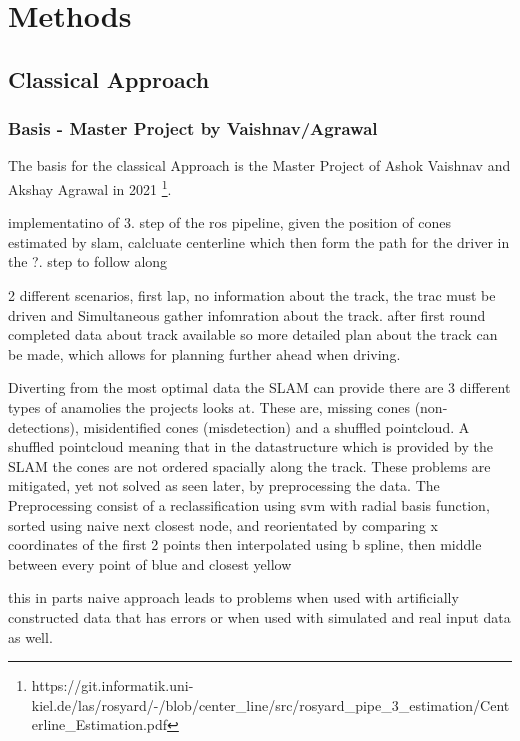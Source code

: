 \graphicspath{{Chapter/Figs/methods/}}
\chapter{Methods}

\section{Classical Approach}

\subsection{Basis - Master Project by Vaishnav/Agrawal}
The basis for the classical Approach is the Master Project of Ashok Vaishnav and Akshay Agrawal in 2021 \footnote{https://git.informatik.uni-kiel.de/las/rosyard/-/blob/center_line/src/rosyard_pipe_3_estimation/Centerline_Estimation.pdf}.

implementatino of 3. step of the ros pipeline, given the position of cones estimated by slam, calcluate centerline which then form the path for the driver in the ?. step to follow along

2 different scenarios, first lap, no information about the track, the trac must be driven and Simultaneous gather infomration about the track. after first round completed data about track available so more detailed plan about the track can be made, which allows for planning further ahead when driving.


Diverting from the most optimal data the SLAM can provide there are 3 different types of anamolies the projects looks at. These are, missing cones (non-detections), misidentified cones (misdetection) and a shuffled pointcloud. A shuffled pointcloud meaning that in the datastructure which is provided by the SLAM the cones are not ordered spacially along the track. These problems are mitigated, yet not solved as seen later, by preprocessing the data. The Preprocessing consist of a reclassification using svm with radial basis function, sorted using naive next closest node, and reorientated by comparing x coordinates of the first 2 points
then interpolated using b spline, then middle between every point of blue and closest yellow

this in parts naive approach leads to problems when used with artificially constructed data that has errors or when used with simulated and real input data as well.

